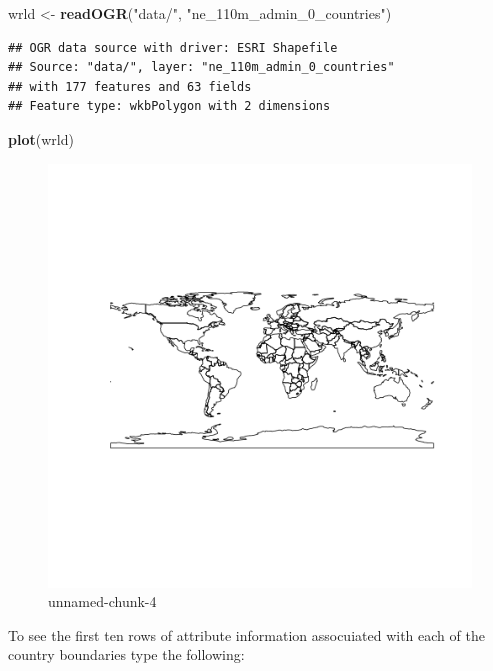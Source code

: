 \documentclass[]{article}
\makeatletter
\newenvironment{Shaded}{}{}
\newcommand{\KeywordTok}[1]{\textcolor[rgb]{0.00,0.44,0.13}{\textbf{{#1}}}}
\newcommand{\StringTok}[1]{\textcolor[rgb]{0.25,0.44,0.63}{{#1}}}
\newcommand{\NormalTok}[1]{{#1}}
\def\maxwidth{\ifdim\Gin@nat@width>\linewidth\linewidth
\else\Gin@nat@width\fi}
\let\Oldincludegraphics\includegraphics
\renewcommand{\includegraphics}[1]{\Oldincludegraphics[width=\maxwidth]{#1}}
\makeatother
\begin{document}
\begin{Shaded}
\begin{Highlighting}[]
\NormalTok{wrld <- }\KeywordTok{readOGR}\NormalTok{(}\StringTok{"data/"}\NormalTok{, }\StringTok{"ne_110m_admin_0_countries"}\NormalTok{)}
\end{Highlighting}
\end{Shaded}
\begin{verbatim}
## OGR data source with driver: ESRI Shapefile 
## Source: "data/", layer: "ne_110m_admin_0_countries"
## with 177 features and 63 fields
## Feature type: wkbPolygon with 2 dimensions
\end{verbatim}
\begin{Shaded}
\begin{Highlighting}[]
\KeywordTok{plot}\NormalTok{(wrld)}
\end{Highlighting}
\end{Shaded}
\begin{figure}[htbp]
\centering
\includegraphics{figure/unnamed-chunk-4.png}
\caption{unnamed-chunk-4}
\end{figure}

To see the first ten rows of attribute information assocuiated with each
of the country boundaries type the following:
\end{document}
